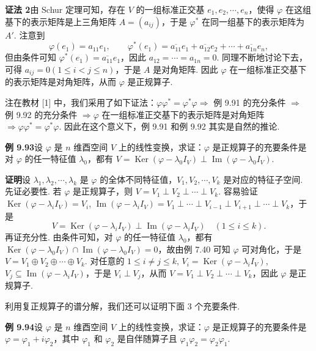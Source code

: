 \documentclass[UTF8,12pt,a4paper,fontset=fandol]{ctexart}
\begin{document}
\noindent\textbf{证法 2}\quad 由 Schur 定理可知，存在 $V$ 的一组标准正交基 $e_1,e_2,\cdots,e_n$，使得 $\varphi$ 在这组基下的表示矩阵是上三角矩阵 $A=(a_{ij})$，于是 $\varphi^*$ 在同一组基下的表示矩阵为 $A'$. 注意到
\[
\varphi(e_1)=a_{11}e_1,\qquad \varphi^*(e_1)=\overline{a_{11}}e_1+\overline{a_{12}}e_2+\cdots+\overline{a_{1n}}e_n,
\]
但由条件可知 $\varphi^*(e_1)=\overline{a_{11}}e_1$，因此 $a_{12}=\cdots=a_{1n}=0$. 同理不断地讨论下去，可得 $a_{ij}=0(1\le i<j\le n)$，于是 $A$ 是对角矩阵. 因此 $\varphi$ 在一组标准正交基下的表示矩阵是对角矩阵，从而 $\varphi$ 是正规算子.

注\quad 在教材 [1] 中，我们采用了如下证法：$\varphi\varphi^*=\varphi^*\varphi\Rightarrow$ 例 9.91 的充分条件 $\Rightarrow$ 例 9.92 的充分条件 $\Rightarrow\varphi$ 在一组标准正交基下的表示矩阵是对角矩阵 $\Rightarrow\varphi\varphi^*=\varphi^*\varphi$. 因此在这个意义下，例 9.91 和例 9.92 其实是自然的推论.

\noindent\textbf{例 9.93}\quad 设 $\varphi$ 是 $n$ 维酉空间 $V$ 上的线性变换，求证：$\varphi$ 是正规算子的充要条件是对 $\varphi$ 的任一特征值 $\lambda_0$，都有 $V=\operatorname{Ker}(\varphi-\lambda_0I_V)\perp\operatorname{Im}(\varphi-\lambda_0I_V)$.

\noindent\textbf{证明}\quad 设 $\lambda_1,\lambda_2,\cdots,\lambda_k$ 是 $\varphi$ 的全体不同特征值，$V_1,V_2,\cdots,V_k$ 是对应的特征子空间. 先证必要性. 若 $\varphi$ 是正规算子，则 $V=V_1\perp V_2\perp\cdots\perp V_k$. 容易验证 $\operatorname{Ker}(\varphi-\lambda_iI_V)=V_i$, $\operatorname{Im}(\varphi-\lambda_iI_V)=V_1\perp\cdots\perp V_{i-1}\perp V_{i+1}\perp\cdots\perp V_k$，于是
\[
V=\operatorname{Ker}(\varphi-\lambda_iI_V)\perp\operatorname{Im}(\varphi-\lambda_iI_V)\quad (1\le i\le k).
\]
再证充分性. 由条件可知，对 $\varphi$ 的任一特征值 $\lambda_0$，都有 $\operatorname{Ker}(\varphi-\lambda_0I_V)\cap\operatorname{Im}(\varphi-\lambda_0I_V)=0$，故由例 7.40 可知 $\varphi$ 可对角化，于是 $V=V_1\oplus V_2\oplus\cdots\oplus V_k$. 对任意的 $1\le i\ne j\le k$, $V_i=\operatorname{Ker}(\varphi-\lambda_iI_V)$, $V_j\subseteq\operatorname{Im}(\varphi-\lambda_iI_V)$，于是 $V_i\perp V_j$，从而 $V=V_1\perp V_2\perp\cdots\perp V_k$，因此 $\varphi$ 是正规算子.

利用复正规算子的谱分解，我们还可以证明下面 3 个充要条件.

\noindent\textbf{例 9.94}\quad 设 $\varphi$ 是 $n$ 维酉空间 $V$ 上的线性变换，求证：$\varphi$ 是正规算子的充要条件是 $\varphi=\varphi_1+i\varphi_2$，其中 $\varphi_1$ 和 $\varphi_2$ 是自伴随算子且 $\varphi_1\varphi_2=\varphi_2\varphi_1$.
\end{document}
